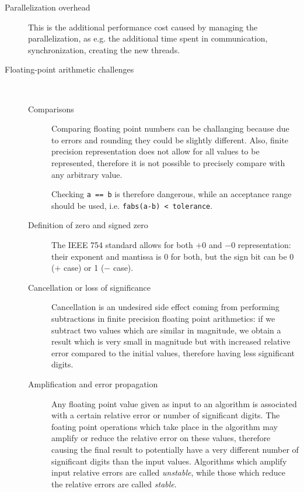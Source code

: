 \documentclass{article}
\begin{document}
\begin{description}
	\item[Parallelization overhead] This is the additional performance cost caused by managing the parallelization, as e.g. the additional time spent in communication, synchronization, creating the new threads.
	
	\item[Floating-point arithmetic challenges] ~
				\begin{description}
			\item[Comparisons] Comparing floating point numbers can be challanging because due to errors and rounding they could be slightly different. Also, finite precision representation does not allow for all values to be represented, therefore it is not possible to precisely compare with any arbitrary value.

			Checking \verb!a == b! is therefore dangerous, while an acceptance range should be used, i.e. \verb!fabs(a-b) < tolerance!.
			\item[Definition of zero and signed zero] The IEEE 754 standard allows for both $+0$ and $-0$ representation: their exponent and mantissa is $0$ for both, but the sign bit can be 0 ($+$ case) or 1 ($-$ case).
			\item[Cancellation or loss of significance] Cancellation is an undesired side effect coming from performing subtractions in finite precision floating point arithmetics: if we subtract two values which are similar in magnitude, we obtain a result which is very small in magnitude but with increased relative error compared to the initial values, therefore having less significant digits.
			\item[Amplification and error propagation] Any floating point value given as input to an algorithm is associated with a certain relative error or number of significant digits. The foating point operations which take place in the algorithm may amplify or reduce the relative error on these values, therefore causing the final result to potentially have a very different number of significant digits than the input values. Algorithms which amplify input relative errors are called \emph{unstable}, while those which reduce the relative errors are called \emph{stable}.
		\end{description}
\end{description}
\end{document}

